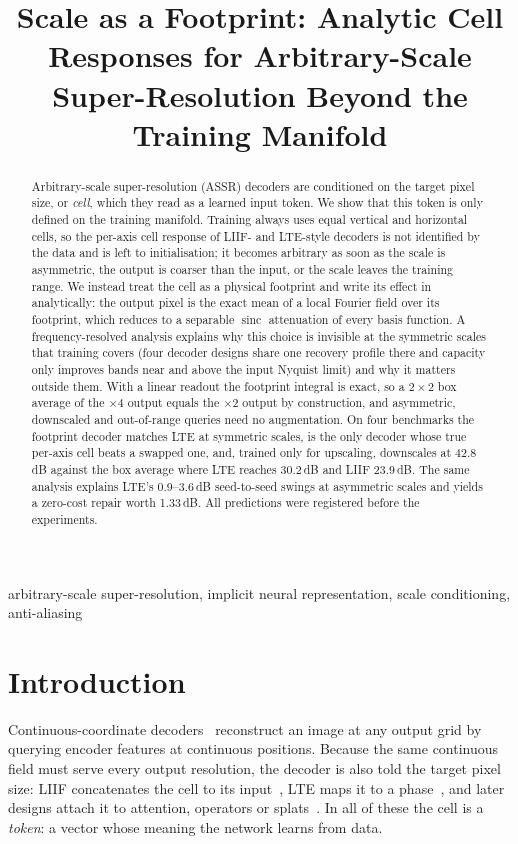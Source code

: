 \documentclass[conference]{IEEEtran}
\title{Scale as a Footprint: Analytic Cell Responses for Arbitrary-Scale Super-Resolution Beyond the Training Manifold}
\author{\IEEEauthorblockN{Anonymous ICME submission}}
\newcommand{\sinc}{\operatorname{sinc}}
\begin{document}
\maketitle

\begin{abstract}
Arbitrary-scale super-resolution (ASSR) decoders are conditioned on the target pixel size, or \emph{cell}, which they read as a learned input token. We show that this token is only defined on the training manifold. Training always uses equal vertical and horizontal cells, so the per-axis cell response of LIIF- and LTE-style decoders is not identified by the data and is left to initialisation; it becomes arbitrary as soon as the scale is asymmetric, the output is coarser than the input, or the scale leaves the training range. We instead treat the cell as a physical footprint and write its effect in analytically: the output pixel is the exact mean of a local Fourier field over its footprint, which reduces to a separable $\sinc$ attenuation of every basis function. A frequency-resolved analysis explains why this choice is invisible at the symmetric scales that training covers (four decoder designs share one recovery profile there and capacity only improves bands near and above the input Nyquist limit) and why it matters outside them. With a linear readout the footprint integral is exact, so a $2{\times}2$ box average of the $\times 4$ output equals the $\times 2$ output by construction, and asymmetric, downscaled and out-of-range queries need no augmentation. On four benchmarks the footprint decoder matches LTE at symmetric scales, is the only decoder whose true per-axis cell beats a swapped one, and, trained only for upscaling, downscales at 42.8\,dB against the box average where LTE reaches 30.2\,dB and LIIF 23.9\,dB. The same analysis explains LTE's 0.9--3.6\,dB seed-to-seed swings at asymmetric scales and yields a zero-cost repair worth 1.33\,dB. All predictions were registered before the experiments.
\end{abstract}

\begin{IEEEkeywords}
arbitrary-scale super-resolution, implicit neural representation, scale conditioning, anti-aliasing
\end{IEEEkeywords}

\section{Introduction}
Continuous-coordinate decoders~\cite{chen2021liif,lee2022lte} reconstruct an image at any output grid by querying encoder features at continuous positions. Because the same continuous field must serve every output resolution, the decoder is also told the target pixel size: LIIF concatenates the cell to its input~\cite{chen2021liif}, LTE maps it to a phase~\cite{lee2022lte}, and later designs attach it to attention, operators or splats~\cite{cao2023ciaosr,wei2023srno,hu2024gaussiansr}. In all of these the cell is a \emph{token}: a vector whose meaning the network learns from data.
\end{document}

